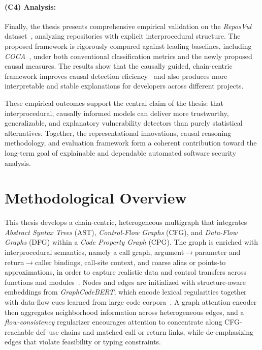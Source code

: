\documentclass{buthesis}
\begin{document}
\paragraph{(C4) Analysis:}
Finally, the thesis presents comprehensive empirical validation on the \emph{ReposVul} dataset~\cite{wang2024reposvul}, analyzing repositories with explicit interprocedural structure. The proposed framework is rigorously compared against leading baselines, including \emph{COCA}~\cite{Cao2024ICSE}, under both conventional classification metrics and the newly proposed causal measures. The results show that the causally guided, chain-centric framework improves causal detection eficiency~\cite{Cao2024ASE,Kuang2024KSEM,Rahman2024ICSE} and also produces more interpretable and stable explanations for developers across different projects.

These empirical outcomes support the central claim of the thesis: that interprocedural, causally informed models can deliver more trustworthy, generalizable, and explanatory vulnerability detectors than purely statistical alternatives. Together, the representational innovations, causal reasoning methodology, and evaluation framework form a coherent contribution toward the long-term goal of explainable and dependable automated software security analysis.


\section{Methodological Overview}
\label{sec:intro-method}

This thesis develops a chain-centric, heterogeneous multigraph that integrates \emph{Abstract Syntax Trees} (AST), \emph{Control-Flow Graphs} (CFG), and \emph{Data-Flow Graphs} (DFG) within a \emph{Code Property Graph} (CPG). The graph is enriched with interprocedural semantics, namely a call graph, argument$\rightarrow$parameter and return$\rightarrow$caller bindings, call-site context, and coarse alias or points-to approximations, in order to capture realistic data and control transfers across functions and modules~\cite{yagemann2021automated}. Nodes and edges are initialized with structure-aware embeddings from \emph{GraphCodeBERT}, which encode lexical regularities together with data-flow cues learned from large code corpora~\cite{guo2021graphcodebert}. A graph attention encoder then aggregates neighborhood information across heterogeneous edges, and a \emph{flow-consistency} regularizer encourages attention to concentrate along CFG-reachable def--use chains and matched call or return links, while de-emphasizing edges that violate feasibility or typing constraints.
\end{document}

